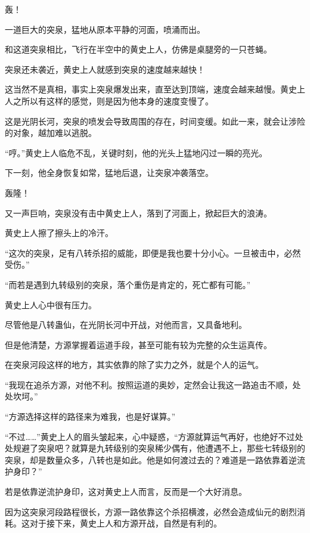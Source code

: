 
\begin{this_body}



轰！

一道巨大的突泉，猛地从原本平静的河面，喷涌而出。

和这道突泉相比，飞行在半空中的黄史上人，仿佛是桌腿旁的一只苍蝇。

突泉还未袭近，黄史上人就感到突泉的速度越来越快！

这当然不是真相，事实上突泉爆发出来，直至达到顶端，速度会越来越慢。黄史上人之所以有这样的感觉，则是因为他本身的速度变慢了。

这是光阴长河，突泉的喷发会导致周围的存在，时间变缓。如此一来，就会让涉险的对象，越加难以逃脱。

“哼。”黄史上人临危不乱，关键时刻，他的光头上猛地闪过一瞬的亮光。

下一刻，他全身恢复如常，猛地后退，让突泉冲袭落空。

轰隆！

又一声巨响，突泉没有击中黄史上人，落到了河面上，掀起巨大的浪涛。

黄史上人擦了擦头上的冷汗。

“这次的突泉，足有八转杀招的威能，即便是我也要十分小心。一旦被击中，必然受伤。”

“而若是遇到九转级别的突泉，落个重伤是肯定的，死亡都有可能。”

黄史上人心中很有压力。

尽管他是八转蛊仙，在光阴长河中开战，对他而言，又具备地利。

但是他清楚，方源掌握着运道手段，甚至可能有较为完整的众生运真传。

在突泉河段这样的地方，其实依靠的除了实力之外，就是个人的运气。

“我现在追杀方源，对他不利。按照运道的奥妙，定然会让我这一路追击不顺，处处坎坷。”

“方源选择这样的路径来为难我，也是好谋算。”

“不过……”黄史上人的眉头皱起来，心中疑惑，“方源就算运气再好，也绝好不过处处规避了突泉吧？就算是九转级别的突泉稀少偶有，他遭遇不上，那些七转级别的突泉，却是数量众多，八转也是如此。他是如何渡过去的？难道是一路依靠着逆流护身印？”

若是依靠逆流护身印，这对黄史上人而言，反而是一个大好消息。

因为这突泉河段路程很长，方源一路依靠这个杀招横渡，必然会造成仙元的剧烈消耗。这对于接下来，黄史上人和方源开战，自然是有利的。


\end{this_body}
